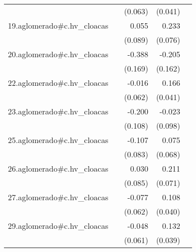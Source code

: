 {\begin{longtable}{l*{4}{D{.}{.}{-1}}}
            &                     &     (0.063)         &     (0.041)         &                     \\
\addlinespace
19.aglomerado#c.hv\_cloacas&                     &       0.055         &       0.233\sym{**} &                     \\
            &                     &     (0.089)         &     (0.076)         &                     \\
\addlinespace
20.aglomerado#c.hv\_cloacas&                     &      -0.388\sym{*}  &      -0.205         &                     \\
            &                     &     (0.169)         &     (0.162)         &                     \\
\addlinespace
22.aglomerado#c.hv\_cloacas&                     &      -0.016         &       0.166\sym{***}&                     \\
            &                     &     (0.062)         &     (0.041)         &                     \\
\addlinespace
23.aglomerado#c.hv\_cloacas&                     &      -0.200         &      -0.023         &                     \\
            &                     &     (0.108)         &     (0.098)         &                     \\
\addlinespace
25.aglomerado#c.hv\_cloacas&                     &      -0.107         &       0.075         &                     \\
            &                     &     (0.083)         &     (0.068)         &                     \\
\addlinespace
26.aglomerado#c.hv\_cloacas&                     &       0.030         &       0.211\sym{**} &                     \\
            &                     &     (0.085)         &     (0.071)         &                     \\
\addlinespace
27.aglomerado#c.hv\_cloacas&                     &      -0.077         &       0.108\sym{**} &                     \\
            &                     &     (0.062)         &     (0.040)         &                     \\
\addlinespace
29.aglomerado#c.hv\_cloacas&                     &      -0.048         &       0.132\sym{***}&                     \\
            &                     &     (0.061)         &     (0.039)         &                     \\

\end{longtable}}
